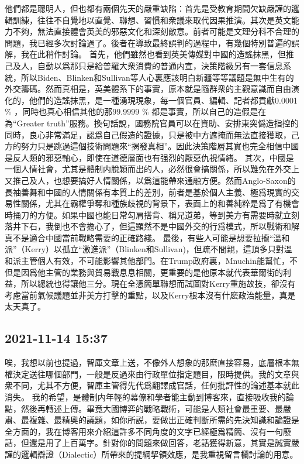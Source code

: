 \documentclass[twocolumn]{ctexart}
\begin{document}
他們都是聰明人，但也都有兩個先天的嚴重缺陷：首先是受教育期間欠缺嚴謹的邏輯訓練，往往不自覺地以直覺、聯想、習慣和衆議來取代因果推演。其次是英文能力不夠，無法直接體會英美的邪惡文化和深刻敵意。前者可能是文理分科不合理的問題，我已經多次討論過了。後者在導致最終誤判的過程中，有幾個特別普遍的誤解，我在此稍作討論。
首先，他們雖然也看到英美傳媒對中國的造謠抹黑，但推己及人，自動以爲那只是給普羅大衆消費的普通内宣，決策階級另有一套信息系統，所以Biden、Blinken和Sullivan等人心裏應該明白新疆等等議題是無中生有的外交籌碼。然而真相是，英美體系下的事實，原本就是隨群衆的主觀意識而自由演化的，他們的造謠抹黑，是一種湧現現象，每一個官員、編輯、記者都貢獻0.0001 \% ，同時也真心相信其他的那99.9999 \% 都是事實，所以自己的造假是在為“Greater truth”服務。換句話說，國務院官員可以在資助、安排東突僞造指控的同時，良心非常滿足，認爲自己假造的證據，只是被中方遮掩而無法直接獲取，己方的努力只是跳過這個技術問題來“揭發真相”。因此決策階層其實也完全相信中國是反人類的邪惡軸心，即使在道德層面也有强烈的厭惡仇視情緒。
其次，中國是一個人情社會，尤其是體制内脫穎而出的人，必然很會搞關係，所以難免在外交上又推己及人，也想要搞好人情關係，以爲這能帶來通融方便。然而Anglo-Saxon的長袖善舞和中國的人情關係有本質上的差別，前者是基於個人主義、極爲現實的交易性關係，尤其在霸權爭奪和種族歧視的背景下，表面上的和善純粹是爲了有機會時捅刀的方便。如果中國也能日常勾肩搭背、稱兄道弟，等到美方有需要時就立刻落井下石，我倒也不會擔心了，但這顯然不是中國外交的行爲模式，所以戰術和解真不是適合中國當前戰略需要的正確路綫。
最後，有些人可能是想要拉攏“溫和派”（Kerry）以孤立“激進派”（Blinken和Sullivan)，但疏不間親，這頂多只對溫和派主管個人有效，不可能影響其他部門。在Trump政府裏，Mnuchin能幫忙，不但是因爲他主管的業務與貿易戰息息相關，更重要的是他原本就代表華爾街的利益，所以總統也得讓他三分。現在全憑簡單聯想而試圖對Kerry重施故技，卻沒有考慮當前氣候議題並非美方打擊的重點，以及Kerry根本沒有什麽政治能量，真是太天真了。
\subsection*{2021-11-14 15:37}

唉，我想以前也提過，智庫文章上送，不像外人想象的那麽直接容易，底層根本無權決定送往哪個部門，一般是反過來由行政單位指定題目，限時提供。我的文章與衆不同，尤其不方便，智庫主管得先代爲翻譯成官話，任何批評性的論述基本就此消失。
我的希望，是體制内年輕的幕僚和學者能主動到博客來，直接吸收我的論點，然後再轉述上傳。畢竟大國博弈的戰略戰術，可能是人類社會最重要、最嚴肅、最複雜、最精奧的議題，如你所説，要做出正確判斷所需的先決知識和論證是全方面的，我在博客用來介紹這許多不同角度的文字已經極爲精簡、沒有一句廢話，但還是用了上百萬字。針對你的問題來做回答，老話獲得新意，其實是誠實嚴謹的邏輯辯證（Dialectic）所帶來的提綱挈領效應，是我重視留言欄討論的用意。
\end{document}
